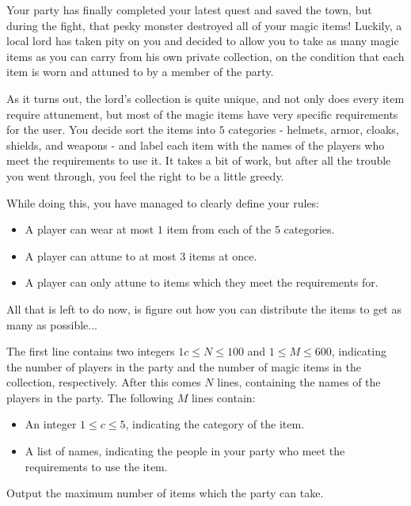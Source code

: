 
Your party has finally completed your latest quest and saved the town, but during the fight, that pesky monster destroyed all of your magic items!
Luckily, a local lord has taken pity on you and decided to allow you to take as many magic items as you can carry from his own private collection, on the condition that each item is worn and attuned to by a member of the party.

As it turns out, the lord's collection is quite unique, and not only does every item require attunement, but most of the magic items have very specific requirements for the user.
You decide sort the items into $5$ categories - helmets, armor, cloaks, shields, and weapons - and label each item with the names of the players who meet the requirements to use it.
It takes a bit of work, but after all the trouble you went through, you feel the right to be a little greedy.

While doing this, you have managed to clearly define your rules:

\begin{itemize}
\item A player can wear at most $1$ item from each of the $5$ categories.
\item A player can attune to at most $3$ items at once.
\item A player can only attune to items which they meet the requirements for.
\end{itemize}

All that is left to do now, is figure out how you can distribute the items to get as many as possible...

\begin{Input}

The first line contains two integers $1c\leq N \leq 100$ and $1 \leq M \leq 600$, indicating the number of players in the party and the number of magic items in the collection, respectively.
After this comes $N$ lines, containing the names of the players in the party.
The following $M$ lines contain:

\begin{itemize}
\item An integer $1 \leq c \leq 5$, indicating the category of the item.
\item A list of names, indicating the people in your party who meet the requirements to use the item.
\end{itemize}
\end{Input}

\begin{Output}
    
Output the maximum number of items which the party can take.
\end{Output}